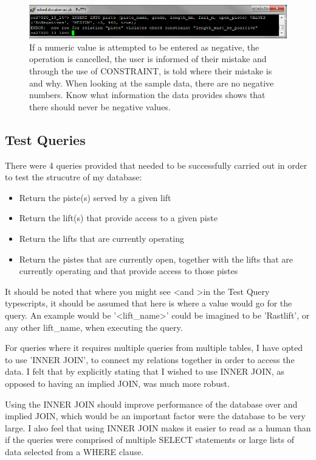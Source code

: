 \documentclass[11pt]{scrartcl} %
\begin{document}
\begin{figure}[H]
  \centering
    \includegraphics[width=1\textwidth]{IMG/err_no_negatives.png}
 \caption{If a numeric value is attempted to be entered as negative, the operation is cancelled, the user is informed of their mistake and through the use of CONSTRAINT, is told where their mistake is and why. When looking at the sample data, there are no negative numbers. Know what information the data provides shows that there should never be negative values.}
\end{figure}
\newpage

\subsection{Test Queries}
There were 4 queries provided that needed to be successfully carried out in order to test the strucutre of my database:
\begin{itemize}
\item Return the piste(s) served by a given lift
\item Return the lift(s) that provide access to a given piste
\item Return the lifts that are currently operating
\item Return the pistes that are currently open, together with the lifts that are currently operating and that provide access to those pistes
\end{itemize}
It should be noted that where you might see \textless \space and \textgreater in the Test Query typescripts, it should be assumed that here is where a value would go for the query. An example would be '\textless lift\_name\textgreater ' could be imagined to be 'Rastlift', or any other lift\_name, when executing the query.

For queries where it requires multiple queries from multiple tables, I have opted to use 'INNER JOIN', to connect my relations together in order to access the data. I felt that by explicitly stating that I wished to use INNER JOIN, as opposed to having an implied JOIN, was much more robust.

Using the INNER JOIN should improve performance of the database over and implied JOIN, which would be an important factor were the database to be very large. I also feel that using INNER JOIN makes it easier to read as a human than if the queries were comprised of multiple SELECT statements or large lists of data selected from a WHERE clause.
\end{document}
